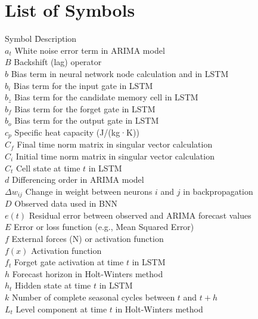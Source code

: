 \chapter*{List of Symbols}

\begin{tabbing}
Symbol \quad \= Description \\
$a_t$ \> White noise error term in ARIMA model \\
$B$ \> Backshift (lag) operator \\
$b$ \> Bias term in neural network node calculation and in LSTM \\
$b_i$ \> Bias term for the input gate in LSTM \\
$b_z$ \> Bias term for the candidate memory cell in LSTM \\
$b_f$ \> Bias term for the forget gate in LSTM \\
$b_o$ \> Bias term for the output gate in LSTM \\
$c_p$ \> Specific heat capacity (J/(kg·K)) \\
$C_f$ \> Final time norm matrix in singular vector calculation \\
$C_i$ \> Initial time norm matrix in singular vector calculation \\
$C_t$ \> Cell state at time $t$ in LSTM \\
$d$ \> Differencing order in ARIMA model \\
$\Delta w_{ij}$ \> Change in weight between neurons $i$ and $j$ in backpropagation \\
$D$ \> Observed data used in BNN \\
$e(t)$ \> Residual error between observed and ARIMA forecast values \\
$E$ \> Error or loss function (e.g., Mean Squared Error) \\
$f$ \> External forces (N) or activation function \\
$f(x)$ \> Activation function \\
$f_t$ \> Forget gate activation at time $t$ in LSTM \\
$h$ \> Forecast horizon in Holt-Winters method \\
$h_t$ \> Hidden state at time $t$ in LSTM \\
$k$ \> Number of complete seasonal cycles between $t$ and $t+h$ \\
$L_t$ \> Level component at time $t$ in Holt-Winters method \\

\end{tabbing}
